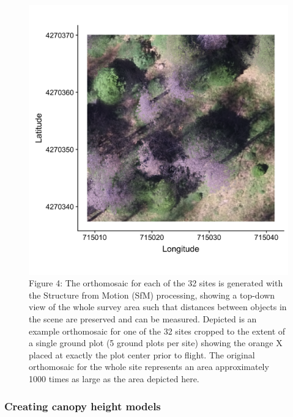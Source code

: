 \documentclass[]{article}
\begin{document}
\begin{figure}
\centering
\includegraphics{../../figures/eldo_3k_3_2_ortho-rgb.png}
\caption{Figure 4: The orthomosaic for each of the 32 sites is generated
with the Structure from Motion (SfM) processing, showing a top-down view
of the whole survey area such that distances between objects in the
scene are preserved and can be measured. Depicted is an example
orthomosaic for one of the 32 sites cropped to the extent of a single
ground plot (5 ground plots per site) showing the orange X placed at
exactly the plot center prior to flight. The original orthomosaic for
the whole site represents an area approximately 1000 times as large as
the area depicted here.}
\end{figure}

\subsubsection{Creating canopy height
models}\label{creating-canopy-height-models}
\end{document}
